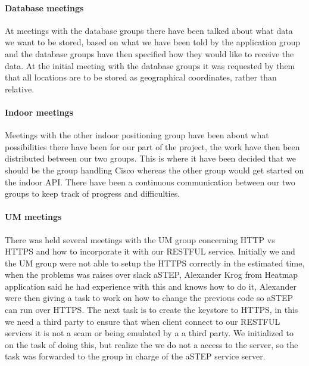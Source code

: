 \paragraph{Database meetings}
At meetings with the database groups there have been talked about what data we want to be stored, based on what we have been told by the application group and the database groups have then specified how they would like to receive the data. At the initial meeting with the database groups it was requested by them that all locations are to be stored as geographical coordinates, rather than relative.%

\paragraph{Indoor meetings}
Meetings with the other indoor positioning group have been about what possibilities there have been for our part of the project, the work have then been distributed between our two groups. This is where it have been decided that we should be the group handling Cisco whereas the other group would get started on the indoor API. There have been a continuous communication between our two groups to keep track of progress and difficulties. 

\paragraph{UM meetings}
There was held several meetings with the UM group concerning HTTP vs HTTPS and how to incorporate it with our RESTFUL service. Initially we and the UM group were not able to setup the HTTPS correctly in the estimated time, when the problems was raises over slack aSTEP, Alexander Krog from Heatmap application said he had experience with this and knows how to do it, Alexander were then giving a task to work on how to change the previous code so aSTEP can run over HTTPS. The next task is to create the keystore to HTTPS, in this we need a third party to ensure that when client connect to our RESTFUL services it is not a scam or being emulated by a a third party. We initialized to on the task of doing this, but realize the we do not a access to the server, so the task was forwarded to the group in charge of the aSTEP service server. 
